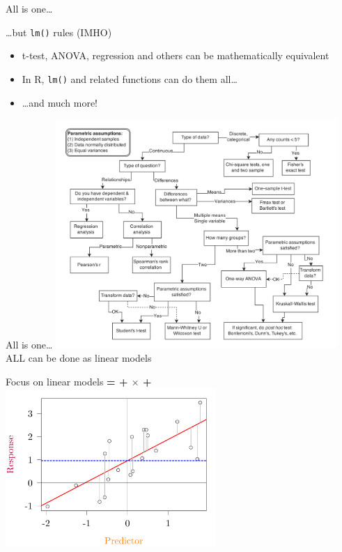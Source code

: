 \documentclass[10pt]{beamer}
\begin{document}
\begin{frame}{All is one\dots}
\pause
  \begin{block}{\dots but \texttt{lm()} rules (IMHO)}
    \begin{itemize}
      \item t-test, ANOVA, regression and others can be mathematically equivalent
      \item In R, \texttt{lm()} and related functions can do them all\dots
      \item \dots and much more!
    \end{itemize}
  \end{block}
\end{frame}


\begin{frame}{All is one\dots}
\centering
    \includegraphics[width=0.8\textwidth]{Figures/modeldecision}\\
ALL can be done as linear models
\end{frame}

\begin{frame}{Focus on linear models}
  \textbf{{\color{purple}{Response}} = {\color{blue}{Intercept}} + {\color{red}{Slope}} $\times$ {\color{orange}{Predictor}} + {\color{gray}{Error}}} \\

\centering
\includegraphics[width=0.6\textwidth]{Figures/figure/lmprinc-1}
\end{frame}
\end{document}
